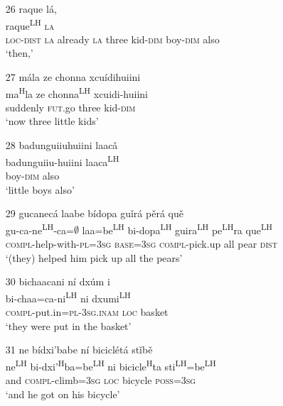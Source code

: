 \begin{itemize}
\item[26]
\glll raque l\'{a}, \\
raque\textsuperscript{LH} \textsc{la} \\
\textsc{loc}-\textsc{dist} \textsc{la} already \textsc{la} { } three kid-\textsc{dim} boy-\textsc{dim} also \\
\glt `then,'


\item[27]
\glll m\'{a}la ze chonna xcu\'{i}dihuiini \\
ma\textsuperscript{H}la ze chonna\textsuperscript{LH} xcuidi-huiini \\
suddenly \textsc{fut}.go three kid-\textsc{dim}  \\
\glt `now three little kids'


\item[28]
\glll badunguiiuhuiini laac\v{a} \\
badunguiiu-huiini laaca\textsuperscript{LH} \\
boy-\textsc{dim} also \\
\glt `little boys also'


\item[29]
\glll gucanec\'{a} laabe b\'{i}dopa gu\v{i}r\'{a} p\v{e}r\'{a} qu\v{e} \\
gu-ca-ne\textsuperscript{LH}-ca=$\emptyset$ laa=be\textsuperscript{LH} bi-dopa\textsuperscript{LH} guira\textsuperscript{LH} pe\textsuperscript{LH}ra que\textsuperscript{LH} \\
\textsc{compl}-help-with-\textsc{pl}=\textsc{3sg} \textsc{base}=\textsc{3sg} \textsc{compl}-pick.up all pear \textsc{dist}  \\
\glt `(they) helped him pick up all the pears'
 

\item[30]
\glll bichaacani n\'{i} dx\'{u}m\v{ i}\\
bi-chaa=ca-ni\textsuperscript{LH} ni dxumi\textsuperscript{LH} \\
\textsc{compl}-put.in=\textsc{pl}-\textsc{3sg.inam} \textsc{loc} basket \\
\glt `they were put in the basket'
 

\item[31]
\glll ne b\'{i}dxi'babe n\'{i} bicicl\'{e}t\'{a} st\v{i}b\v{e} \\
ne\textsuperscript{LH} bi-dxi'\textsuperscript{H}ba=be\textsuperscript{LH} ni bicicle\textsuperscript{H}ta sti\textsuperscript{LH}=be\textsuperscript{LH} \\
and \textsc{compl}-climb=\textsc{3sg} \textsc{loc} bicycle \textsc{poss}=\textsc{3sg} \\
\glt `and he got on his bicycle'



\end{itemize}
